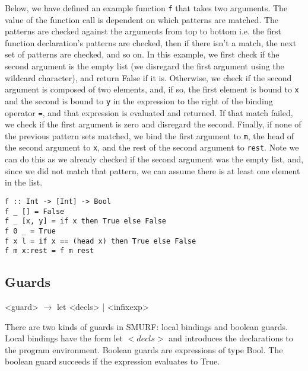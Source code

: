 Below, we have defined an example function \texttt{f} that takes two arguments. 
The value of the function call is dependent
on which patterns are matched. The patterns are checked against the arguments from top to bottom i.e. the first
function declaration's patterns are checked, then if there isn't a match, the next set of patterns are checked,
and so on. In this example, we first check if the second argument is the empty list (we disregard the first
argument using the wildcard character), and return False if it is. Otherwise, we check if the second argument
is composed of two elements, and, if so, the first element is bound to \texttt{x} and the second is bound to
\texttt{y} in the expression to the right of the binding operator \texttt{=}, and that expression is evaluated and
returned. If that match failed, we check if the first argument is zero and disregard the second. Finally, if
none of the previous pattern sets matched, we bind the first argument to \texttt{m}, the head of the
second argument to \texttt{x}, and the rest of the second argument to \texttt{rest}. Note we can do this
as we already checked if the second argument was the empty list, and, since we did not match that pattern,
we can assume there is at least one element in the list.

\begin{verbatim}
f :: Int -> [Int] -> Bool
f _ [] = False
f _ [x, y] = if x then True else False
f 0 _ = True
f x l = if x == (head x) then True else False
f m x:rest = f m rest 
\end{verbatim}

\subsection{Guards}
\begin{grammar}
<guard> $\rightarrow$  let <decls> | <infixexp>          
\end{grammar}

There are two kinds of guards in SMURF: local bindings and boolean guards. Local bindings have the form let $<decls>$ and introduces the declarations to the program environment. Boolean guards are expressions of type Bool. The boolean guard succeeds if the expression evaluates to True.

